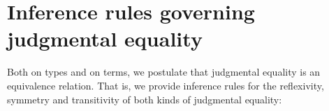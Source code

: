 \section{Inference rules governing judgmental equality}

\begin{samepage}
Both on types and on terms, we postulate that judgmental equality is an equivalence relation. That is, we provide inference rules for the reflexivity, symmetry and transitivity of both kinds of judgmental equality:
\begin{center}
\begin{small}
\begin{minipage}{.2\textwidth}
\begin{prooftree}
\end{prooftree}
\end{minipage}
\begin{minipage}{.25\textwidth}
\begin{prooftree}
\end{prooftree}
\end{minipage}
\begin{minipage}{.5\textwidth}
\begin{prooftree}
\end{prooftree}
\end{minipage}
\\
\bigskip
\begin{minipage}{.2\textwidth}
\begin{prooftree}
\end{prooftree}
\end{minipage}
\begin{minipage}{.25\textwidth}
\begin{prooftree}
\end{prooftree}
\end{minipage}
\begin{minipage}{.5\textwidth}
\begin{prooftree}
\end{prooftree}
\end{minipage}
\end{small}
\end{center}
\end{samepage}

